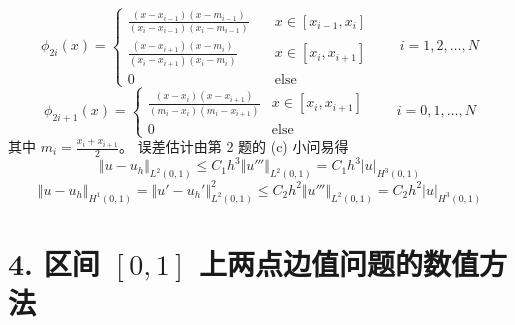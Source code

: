 \documentclass[a4paper]{article}
\begin{document}
\begin{enumerate}
            \begin{equation}
                \phi_{2i}(x) = \begin{cases}
                    \displaystyle\frac{(x-x_{i-1})(x-m_{i-1})}{(x_i-x_{i-1})(x_i-m_{i-1})} \quad & x\in [x_{i-1}, x_i] \\
                    \displaystyle\frac{(x-x_{i+1})(x-m_i)}{(x_i-x_{i+1})(x_i-m_i)} & x\in [x_i, x_{i+1}] \\
                    0 & \text{else}
                \end{cases}
                \qquad i=1,2,\ldots,N
            \end{equation}
            \begin{equation}
                \phi_{2i+1}(x) = \begin{cases}
                    \displaystyle\frac{(x-x_{i})(x-x_{i+1})}{(m_i-x_{i})(m_i-x_{i+1})} & x\in [x_i, x_{i+1}] \\
                    0 & \text{else}
                \end{cases}
                \qquad i=0,1,\ldots,N
            \end{equation}
            其中 $m_i=\frac{x_i+x_{i+1}}{2}$。
            误差估计由第 2 题的 (c) 小问易得
            \begin{equation}
                \Vert u-u_h \Vert_{L^2(0,1)} \leq C_1 h^3 \Vert u''' \Vert_{L^2(0,1)}
                = C_1 h^3 |u|_{H^3(0,1)}
            \end{equation}
            \begin{equation}
                \Vert u-u_h \Vert_{H^1(0,1)}
                = \Vert u'-u_h' \Vert^2_{L^2(0,1)}
                \leq C_2 h^2 \Vert u''' \Vert_{L^2(0,1)}
                = C_2 h^2 |u|_{H^3(0,1)}
            \end{equation}
\end{enumerate}

\section*{4. 区间 $[0,1]$ 上两点边值问题的数值方法}
\end{document}
